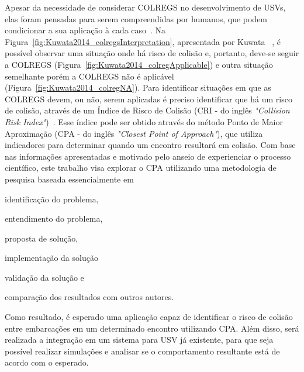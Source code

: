     Apesar da necessidade de considerar COLREGS no desenvolvimento de USVs, elas foram pensadas para serem compreendidas por humanos, que podem condicionar a sua aplicação à cada caso~\cite{KUWATA2014110}. Na Figura~\ref{fig:Kuwata2014_colregsInterpretation}, apresentada por Kuwata \etal~\cite{KUWATA2014110}, é possível observar uma situação onde há risco de colisão e, portanto, deve-se seguir a COLREGS (Figura~\ref{fig:Kuwata2014_colregApplicable}) e outra situação semelhante porém a COLREGS não é aplicável (Figura~\ref{fig:Kuwata2014_colregNA}). Para identificar situações em que as COLREGS devem, ou não, serem aplicadas é preciso identificar que há um risco de colisão, através de um Índice de Risco de Colisão (CRI - do inglês \textit{"Collision Risk Index"})~\cite{HUANG2019142}. Esse índice pode ser obtido através do método Ponto de Maior Aproximação (CPA - do inglês \textit{"Closest Point of Approach"}), que utiliza indicadores para determinar quando um encontro resultará em colisão. Com base nas informações apresentadas e motivado pelo anseio de experienciar o processo científico, este trabalho visa explorar o CPA utilizando uma metodologia de pesquisa baseada essencialmente em 
    \begin{enumerate*}[label=\alph*)]
        \item identificação do problema,
        \item entendimento do problema,
        \item proposta de solução,
        \item implementação da solução
        \item validação da solução e
        \item comparação dos resultados com outros autores.
    \end{enumerate*}
    Como resultado, é esperado uma aplicação capaz de identificar o risco de colisão entre embarcações em um determinado encontro utilizando CPA.
    Além disso, será realizada a integração em um sistema para USV já existente, para que seja possível realizar simulações e analisar se o comportamento resultante está de acordo com o esperado. 
    
